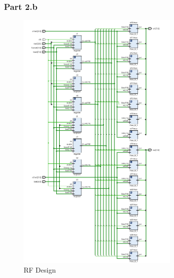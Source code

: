 \documentclass[pdftex,12pt,a4paper]{article}
\begin{document}
\subsubsection{Part 2.b}
\begin{figure}[H]
	\centering
	\includegraphics[width=0.7\textwidth]{design/rf.png}	
	\caption{RF Design}
	\label{RF Design}
\end{figure}
\end{document}
